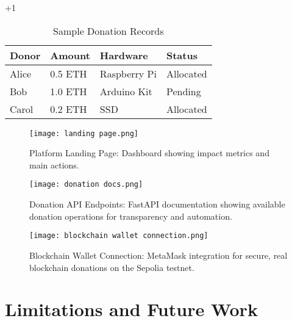 +1\documentclass[conference]{IEEEtran}
\begin{document}
\begin{table}[ht]
\caption{Sample Donation Records}
\centering
\begin{tabular}{|l|l|l|l|}
\hline
Donor & Amount & Hardware & Status \\
\hline
Alice & 0.5 ETH & Raspberry Pi & Allocated \\
Bob & 1.0 ETH & Arduino Kit & Pending \\
Carol & 0.2 ETH & SSD & Allocated \\
\hline
\end{tabular}
\label{tab:donations}
\end{table}


\begin{figure}[ht]
\centering
\texttt{[image: landing page.png]}
\caption{Platform Landing Page: Dashboard showing impact metrics and main actions.}
\label{fig:landingpage}
\end{figure}

\begin{figure}[ht]
\centering
\texttt{[image: donation docs.png]}
\caption{Donation API Endpoints: FastAPI documentation showing available donation operations for transparency and automation.}
\label{fig:donationapi}
\end{figure}

\begin{figure}[ht]
\centering
\texttt{[image: blockchain wallet connection.png]}
\caption{Blockchain Wallet Connection: MetaMask integration for secure, real blockchain donations on the Sepolia testnet.}
\label{fig:walletconnect}
\end{figure}

\section{Limitations and Future Work}
\end{document}

